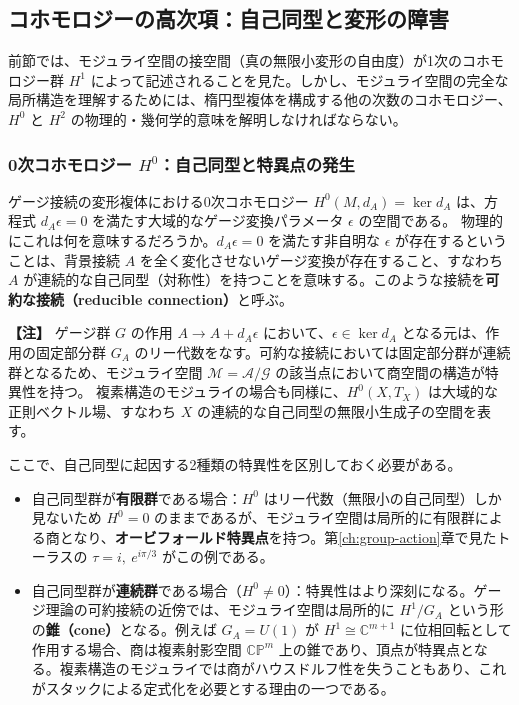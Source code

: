 \documentclass[uplatex, dvipdfmx, book]{jsbook}
\let\origsubsection\subsection
\let\origsubsubsection\subsubsection
\renewcommand{\section}{\origsubsection}
\renewcommand{\subsection}{\origsubsubsection}
\renewcommand{\subsubsection}{\paragraph}
\newenvironment{note}{\vspace{1ex}\par\footnotesize\noindent\textbf{【注】}}{\par\vspace{1ex}}
\begin{document}
\section{コホモロジーの高次項：自己同型と変形の障害}
\label{sec:higher-cohomology}

前節では、モジュライ空間の接空間（真の無限小変形の自由度）が1次のコホモロジー群 $H^1$ によって記述されることを見た。しかし、モジュライ空間の完全な局所構造を理解するためには、楕円型複体を構成する他の次数のコホモロジー、$H^0$ と $H^2$ の物理的・幾何学的意味を解明しなければならない。

\subsection{0次コホモロジー $H^0$：自己同型と特異点の発生}

ゲージ接続の変形複体における0次コホモロジー $H^0(M, d_A) = \ker d_A$ は、方程式 $d_A \epsilon = 0$ を満たす大域的なゲージ変換パラメータ $\epsilon$ の空間である。
物理的にこれは何を意味するだろうか。$d_A \epsilon = 0$ を満たす非自明な $\epsilon$ が存在するということは、背景接続 $A$ を全く変化させないゲージ変換が存在すること、すなわち $A$ が連続的な自己同型（対称性）を持つことを意味する。このような接続を\textbf{可約な接続（reducible connection）}と呼ぶ。

\begin{note}
ゲージ群 $G$ の作用 $A \to A + d_A \epsilon$ において、$\epsilon \in \ker d_A$ となる元は、作用の固定部分群 $G_A$ のリー代数をなす。可約な接続においては固定部分群が連続群となるため、モジュライ空間 $\mathcal{M} = \mathcal{A}/\mathcal{G}$ の該当点において商空間の構造が特異性を持つ。
複素構造のモジュライの場合も同様に、$H^0(X, T_X)$ は大域的な正則ベクトル場、すなわち $X$ の連続的な自己同型の無限小生成子の空間を表す。
\end{note}

ここで、自己同型に起因する2種類の特異性を区別しておく必要がある。
\begin{itemize}
    \item 自己同型群が\textbf{有限群}である場合：$H^0$ はリー代数（無限小の自己同型）しか見ないため $H^0 = 0$ のままであるが、モジュライ空間は局所的に有限群による商となり、\textbf{オービフォールド特異点}を持つ。第\ref{ch:group-action}章で見たトーラスの $\tau = i,\ e^{i\pi/3}$ がこの例である。
    \item 自己同型群が\textbf{連続群}である場合（$H^0 \neq 0$）：特異性はより深刻になる。ゲージ理論の可約接続の近傍では、モジュライ空間は局所的に $H^1 / G_A$ という形の\textbf{錐（cone）}となる。例えば $G_A = U(1)$ が $H^1 \cong \mathbb{C}^{m+1}$ に位相回転として作用する場合、商は複素射影空間 $\mathbb{CP}^m$ 上の錐であり、頂点が特異点となる。複素構造のモジュライでは商がハウスドルフ性を失うこともあり、これがスタックによる定式化を必要とする理由の一つである。
\end{itemize}
\end{document}
